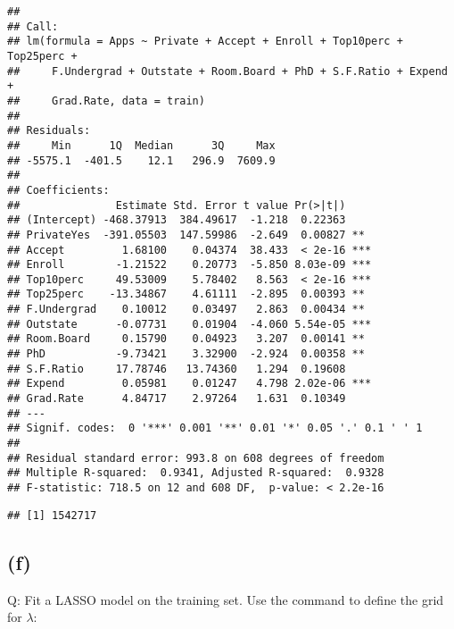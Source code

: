 \documentclass[
]{article}
\newenvironment{Shaded}{\begin{snugshade}}{\end{snugshade}}
\newcommand{\DataTypeTok}[1]{\textcolor[rgb]{0.13,0.29,0.53}{#1}}
\newcommand{\DecValTok}[1]{\textcolor[rgb]{0.00,0.00,0.81}{#1}}
\newcommand{\KeywordTok}[1]{\textcolor[rgb]{0.13,0.29,0.53}{\textbf{#1}}}
\newcommand{\NormalTok}[1]{#1}
\newcommand{\OperatorTok}[1]{\textcolor[rgb]{0.81,0.36,0.00}{\textbf{#1}}}
\newcommand{\StringTok}[1]{\textcolor[rgb]{0.31,0.60,0.02}{#1}}
\begin{document}
\begin{verbatim}
## 
## Call:
## lm(formula = Apps ~ Private + Accept + Enroll + Top10perc + Top25perc + 
##     F.Undergrad + Outstate + Room.Board + PhD + S.F.Ratio + Expend + 
##     Grad.Rate, data = train)
## 
## Residuals:
##     Min      1Q  Median      3Q     Max 
## -5575.1  -401.5    12.1   296.9  7609.9 
## 
## Coefficients:
##               Estimate Std. Error t value Pr(>|t|)    
## (Intercept) -468.37913  384.49617  -1.218  0.22363    
## PrivateYes  -391.05503  147.59986  -2.649  0.00827 ** 
## Accept         1.68100    0.04374  38.433  < 2e-16 ***
## Enroll        -1.21522    0.20773  -5.850 8.03e-09 ***
## Top10perc     49.53009    5.78402   8.563  < 2e-16 ***
## Top25perc    -13.34867    4.61111  -2.895  0.00393 ** 
## F.Undergrad    0.10012    0.03497   2.863  0.00434 ** 
## Outstate      -0.07731    0.01904  -4.060 5.54e-05 ***
## Room.Board     0.15790    0.04923   3.207  0.00141 ** 
## PhD           -9.73421    3.32900  -2.924  0.00358 ** 
## S.F.Ratio     17.78746   13.74360   1.294  0.19608    
## Expend         0.05981    0.01247   4.798 2.02e-06 ***
## Grad.Rate      4.84717    2.97264   1.631  0.10349    
## ---
## Signif. codes:  0 '***' 0.001 '**' 0.01 '*' 0.05 '.' 0.1 ' ' 1
## 
## Residual standard error: 993.8 on 608 degrees of freedom
## Multiple R-squared:  0.9341, Adjusted R-squared:  0.9328 
## F-statistic: 718.5 on 12 and 608 DF,  p-value: < 2.2e-16
\end{verbatim}

\begin{Shaded}
\end{Shaded}

\begin{verbatim}
## [1] 1542717
\end{verbatim}

\hypertarget{f}{%
\subsection{(f)}\label{f}}

Q: Fit a LASSO model on the training set. Use the command to define the
grid for \(\lambda\):
\end{document}
